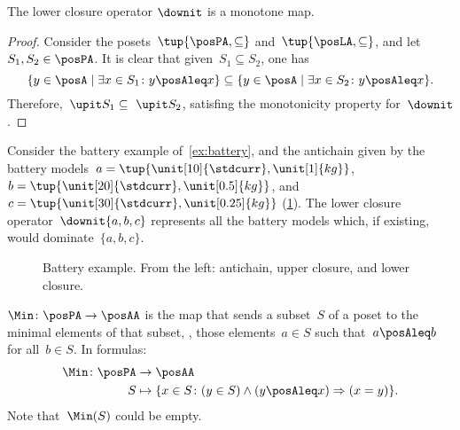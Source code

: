 \begin{lemma}
  The lower closure operator $\downit$ is a monotone map.
\end{lemma}

\begin{proof}
  Consider the posets~$\tup{\posPA,\subseteq}$ and~$\tup{\posLA,\subseteq}$, and let~$S_1,S_2\in \posPA$. It is clear that given~$S_1\subseteq S_2$, one has
  \begin{equation}
    \{y\in \posA\mid \exists x\in S_1\colon y\posAleq x\} \subseteq \{y\in \posA\mid \exists x\in S_2\colon y\posAleq x\}.
  \end{equation}
  Therefore,~$\upit S_1\subseteq \ \upit S_2$, satisfing the monotonicity property for~$\downit$.
\end{proof}



\begin{example}
  Consider the battery example of~\cref{ex:battery}, and the antichain given by the battery models~$a=\tup{\unit[10]{\stdcurr},\unit[1]{kg}}$,~$b=\tup{\unit[20]{\stdcurr},\unit[0.5]{kg}}$, and~$c=\tup{\unit[30]{\stdcurr},\unit[0.25]{kg}}$ (\cref{fig:examplebatt}).
  The lower closure operator~$\downit\{a,b,c\}$ represents all the battery models which, if existing, would dominate~$\{a,b,c\}$.

\end{example}
\begin{figure}[h!]
  \begin{center}
  \end{center}
  \caption{Battery example. From the left: antichain, upper closure, and lower closure.
  \label{fig:examplebatt}}
\end{figure}


\begin{definition}[Min]
  \label{def:Min}
  $\Min \colon \posPA \to \posAA$ is the map that sends a subset~$S$ of a poset to the minimal elements of that subset, \ie , those elements~$a \in S$ such that~$a \posAleq b$ for all~$b \in S$. In formulas:
  \begin{equation*}
    \begin{aligned}
      \Min \colon \posPA &\to \posAA\\
      S&\mapsto \{ x\in S\colon (y\in S)\wedge(y\posAleq x)\Rightarrow (x=y)\}.
    \end{aligned}
  \end{equation*}
  Note that~$\Min(S)$ could be empty.
\end{definition}

